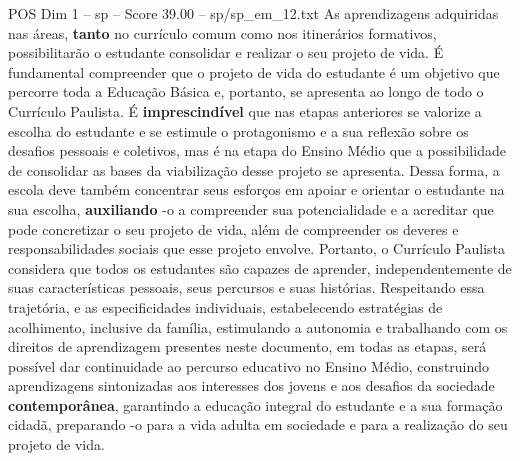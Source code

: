\begin{textsample}{POS Dim 1 – sp – Score 39.00 – sp/sp\_em\_12.txt}
As aprendizagens adquiridas nas áreas, \textbf{tanto} no currículo comum como nos itinerários formativos, possibilitarão o estudante consolidar e realizar o seu projeto de vida.
É fundamental compreender que o projeto de vida do estudante é um objetivo que percorre toda a Educação Básica e, portanto, se apresenta ao longo de todo o Currículo Paulista.
É \textbf{imprescindível} que nas etapas anteriores se valorize a escolha do estudante e se estimule o protagonismo e a sua reflexão sobre os desafios pessoais e coletivos, mas é na etapa do Ensino Médio que a possibilidade de consolidar as bases da viabilização desse projeto se apresenta.
Dessa forma, a escola deve também concentrar seus esforços em apoiar e orientar o estudante na sua escolha, \textbf{auxiliando} -o a compreender sua potencialidade e a acreditar que pode concretizar o seu projeto de vida, além de compreender os deveres e responsabilidades sociais que esse projeto envolve.
Portanto, o Currículo Paulista considera que todos os estudantes são capazes de aprender, independentemente de suas características pessoais, seus percursos e suas histórias.
Respeitando essa trajetória, e as especificidades individuais, estabelecendo estratégias de acolhimento, inclusive da família, estimulando a autonomia e trabalhando com os direitos de aprendizagem presentes neste documento, em todas as etapas, será possível dar continuidade ao percurso educativo no Ensino Médio, construindo aprendizagens sintonizadas aos interesses dos jovens e aos desafios da sociedade \textbf{contemporânea}, garantindo a educação integral do estudante e a sua formação cidadã, preparando -o para a vida adulta em sociedade e para a realização do seu projeto de vida.

\end{textsample}
